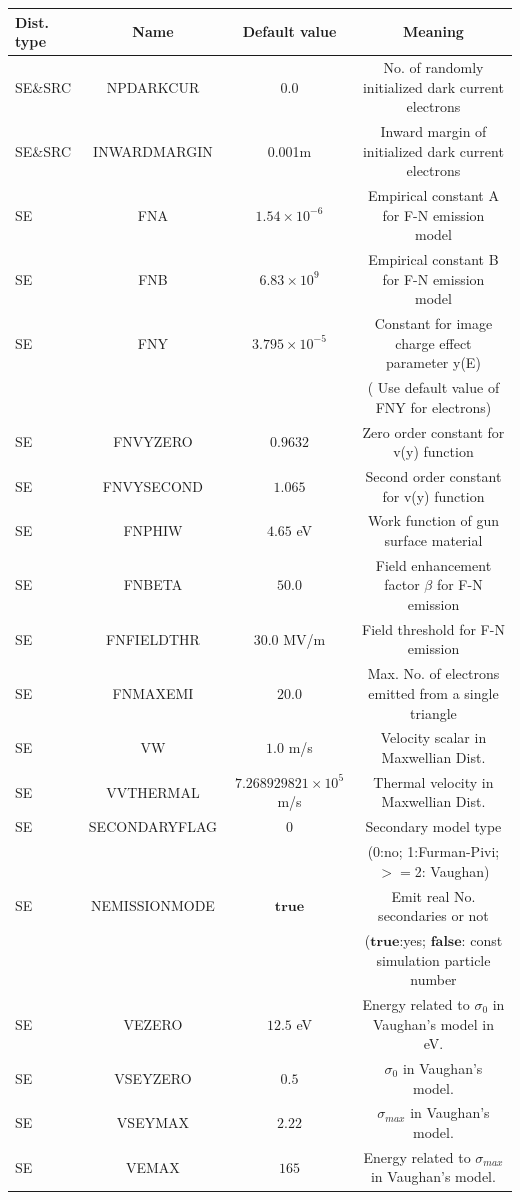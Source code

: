 \documentclass[a4paper,11pt]{article}
\begin{document}
\begin{appendices}
\begin{table}[H]
\begin{tabular}{lccc}
\hline\hline %
Dist. type &Name & Default value & Meaning \\ [0.5ex] %
\hline %
SE\&SRC &NPDARKCUR & 0.0 & No. of randomly initialized dark current electrons\\ %
SE\&SRC &INWARDMARGIN & 0.001m & Inward margin of initialized dark current electrons\\
SE &FNA & $1.54\times10^{-6}$ & Empirical constant A for F-N emission model\\
SE &FNB & $6.83\times10^9$ & Empirical constant B for F-N emission model \\
SE &FNY & $3.795\times10^{-5}$ & Constant for image charge effect parameter y(E) \\ [1ex]%
 &  &  & ( Use default value of FNY for electrons) \\
SE &FNVYZERO & $0.9632$ & Zero order constant for v(y) function \\
SE &FNVYSECOND & $1.065$ & Second order constant for v(y) function \\ 
SE &FNPHIW & $4.65$ eV & Work function of gun surface material \\ 
SE &FNBETA & $50.0$ & Field enhancement factor $\beta$ for F-N emission \\
SE &FNFIELDTHR & $30.0$ MV/m & Field threshold for F-N emission \\
SE &FNMAXEMI & $20.0$ & Max. No. of electrons emitted from a single triangle \\
SE &VW & $1.0$ m/s & Velocity scalar in Maxwellian Dist. \\
SE &VVTHERMAL & $7.268929821\times10^5$ m/s & Thermal velocity in Maxwellian Dist. \\
SE &SECONDARYFLAG & $0$ & Secondary model type\\
& & &(0:no; 1:Furman-Pivi; $>=$2: Vaughan) \\
SE &NEMISSIONMODE & $\mathbf{true}$ & Emit real No. secondaries or not \\
& & &($\mathbf{true}$:yes; $\mathbf{false}$: const simulation particle number \\
SE &VEZERO& $12.5$ eV & Energy related to $\sigma_0$ in Vaughan's model in eV. \\
SE &VSEYZERO& $0.5$ & $\sigma_0$ in Vaughan's model. \\
SE &VSEYMAX& $2.22$ & $\sigma_{max}$ in Vaughan's model. \\
SE &VEMAX& $165$ & Energy related to $\sigma_{max}$ in Vaughan's model. \\   

\end{tabular}
\end{table}
\end{appendices}
\end{document}
